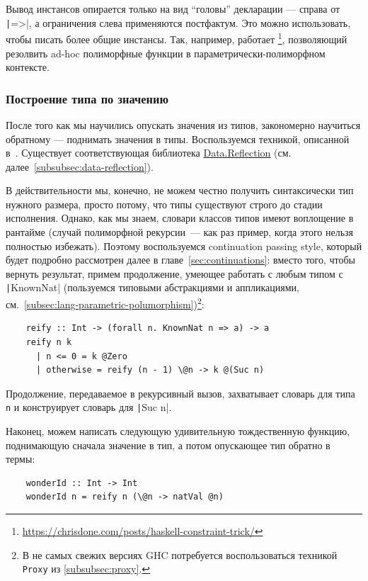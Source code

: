Вывод инстансов опирается только на вид ``головы'' декларации --- справа от \texttt|=>|, а ограничения слева применяются постфактум.
Это можно использовать, чтобы писать более общие инстансы.
Так, например, работает \footnote{\url{https://chrisdone.com/posts/haskell-constraint-trick/}}, позволяющий резолвить ad-hoc полиморфные функции в параметрически-полиморфном контексте.

\subsubsection{Построение типа по значению} \label{subsubsec:reify}

После того как мы научились опускать значения из типов, закономерно научиться обратному --- поднимать значения в типы.
Воспользуемся техникой, описанной в~\cite{kiselyov2004functional}.
Существует соответствующая библиотека \href{https://hackage.haskell.org/package/reflection-2.1.6/docs/Data-Reflection.html}{Data.Reflection} (см. далее\ \ref{subsubsec:data-reflection}).

В действительности мы, конечно, не можем честно получить синтаксически тип нужного размера, просто потому, что типы существуют строго до стадии исполнения.
Однако, как мы знаем, словари классов типов имеют воплощение в рантайме (случай полиморфной рекурсии~--- как раз пример, когда этого нельзя полностью избежать).
Поэтому воспользуемся continuation passing style, который будет подробно рассмотрен далее в главе~\ref{sec:continuations}: вместо того, чтобы вернуть результат, примем продолжение, умеющее работать с любым типом с \texttt|KnownNat| (пользуемся типовыми абстракциями и аппликациями, см.\ \ref{subsec:lang-parametric-polumorphism})\footnote{В не самых свежих версиях GHC потребуется воспользоваться техникой \texttt{Proxy} из \ref{subsubsec:proxy}.}:
\begin{verbatim}
    reify :: Int -> (forall n. KnownNat n => a) -> a
    reify n k
      | n <= 0 = k @Zero
      | otherwise = reify (n - 1) \@n -> k @(Suc n)
\end{verbatim}

Продолжение, передаваемое в рекурсивный вызов, захватывает словарь для типа \texttt{n} и конструирует словарь для \texttt|Suc n|.

Наконец, можем написать следующую удивительную тождественную функцию, поднимающую сначала значение в тип, а потом опускающее тип обратно в термы:
\begin{verbatim}
    wonderId :: Int -> Int
    wonderId n = reify n (\@n -> natVal @n)
\end{verbatim}

